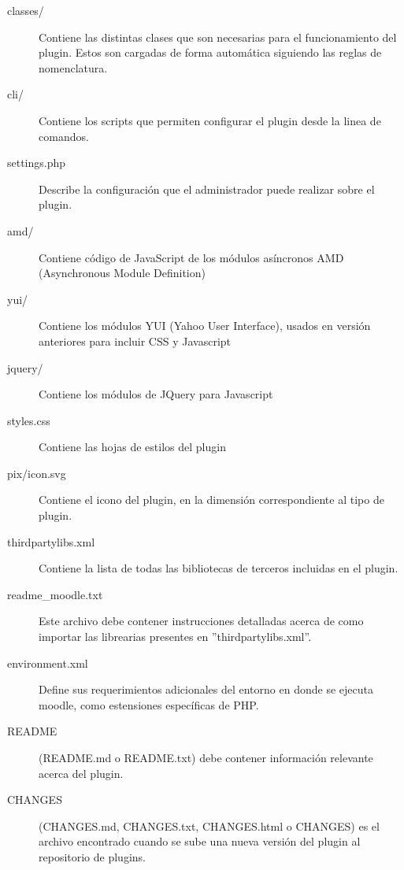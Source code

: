 \begin{description}
    \item[classes/] Contiene las distintas clases que son necesarias para el funcionamiento del plugin. Estos son cargadas de forma automática siguiendo las reglas de nomenclatura.

    \item[cli/] Contiene los scripts que permiten configurar el plugin desde la linea de comandos.

    \item[settings.php] Describe la configuración que el administrador puede realizar sobre el plugin.

    \item[amd/] Contiene código de JavaScript de los módulos asíncronos AMD (Asynchronous Module Definition)

    \item[yui/] Contiene los módulos YUI (Yahoo User Interface), usados en versión anteriores para incluir CSS y Javascript

    \item[jquery/] Contiene los módulos de JQuery para Javascript
    \item[styles.css] Contiene las hojas de estilos del plugin
    \item[pix/icon.svg] Contiene el icono del plugin, en la dimensión correspondiente al tipo de plugin.

    \item[thirdpartylibs.xml] Contiene la lista de todas las bibliotecas de terceros incluidas en el plugin.
    \item[readme\_moodle.txt] Este archivo debe contener instrucciones detalladas acerca de como importar las librearias presentes en ''thirdpartylibs.xml''.

    \item[environment.xml] Define sus requerimientos adicionales del entorno en donde se ejecuta moodle, como estensiones específicas de PHP.

    \item[README] (README.md o README.txt) debe contener información relevante acerca del plugin.
    \item[CHANGES] (CHANGES.md, CHANGES.txt, CHANGES.html o CHANGES) es el archivo encontrado cuando se sube una nueva versión del plugin al repositorio de plugins.
\end{description}